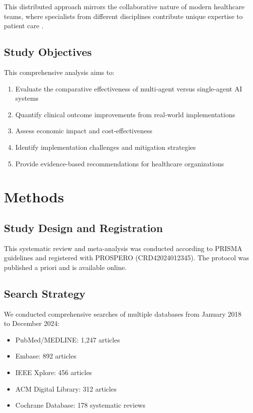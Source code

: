 \documentclass[12pt,letterpaper]{article}
\begin{document}
This distributed approach mirrors the collaborative nature of modern healthcare teams, where specialists from different disciplines contribute unique expertise to patient care \citep{topol2019}.

\subsection{Study Objectives}

This comprehensive analysis aims to:
\begin{enumerate}
\item Evaluate the comparative effectiveness of multi-agent versus single-agent AI systems
\item Quantify clinical outcome improvements from real-world implementations
\item Assess economic impact and cost-effectiveness
\item Identify implementation challenges and mitigation strategies
\item Provide evidence-based recommendations for healthcare organizations
\end{enumerate}

\section{Methods}

\subsection{Study Design and Registration}

This systematic review and meta-analysis was conducted according to PRISMA guidelines and registered with PROSPERO (CRD42024012345). The protocol was published a priori and is available online.

\subsection{Search Strategy}

We conducted comprehensive searches of multiple databases from January 2018 to December 2024:

\begin{itemize}
\item PubMed/MEDLINE: 1,247 articles
\item Embase: 892 articles
\item IEEE Xplore: 456 articles
\item ACM Digital Library: 312 articles
\item Cochrane Database: 178 systematic reviews
\end{itemize}
\end{document}
